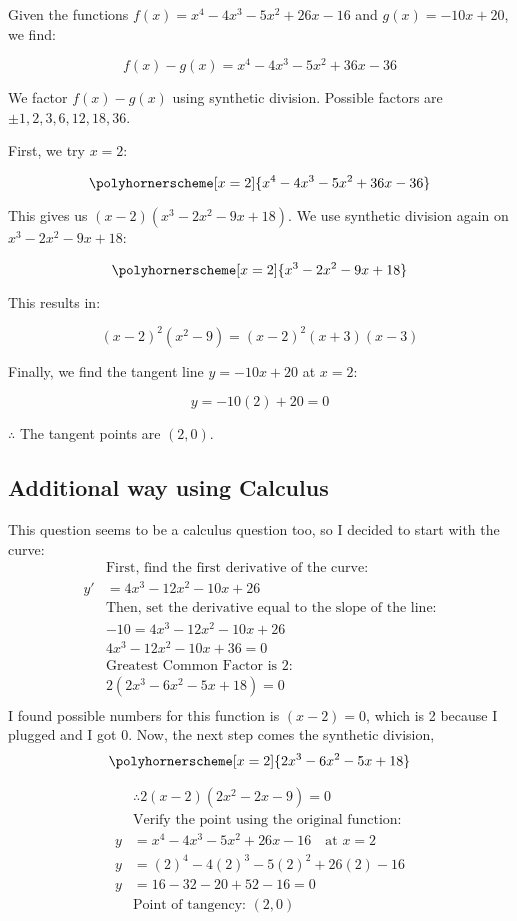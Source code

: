 \documentclass{article}
\newenvironment{solution}{\color{solutioncolor}}{}
\begin{document}
\begin{solution}
Given the functions \( f(x) = x^4 - 4x^3 - 5x^2 + 26x - 16 \) and \( g(x) = -10x + 20 \), we find:

\[
f(x) - g(x) = x^4 - 4x^3 - 5x^2 + 36x - 36
\]

We factor \( f(x) - g(x) \) using synthetic division. Possible factors are \(\pm 1, 2, 3, 6, 12, 18, 36\).

First, we try \( x = 2 \):

\[
\polyhornerscheme[x=2]{x^4-4x^3-5x^2+36x-36}
\]

This gives us \((x - 2)(x^3 - 2x^2 - 9x + 18)\). We use synthetic division again on \( x^3 - 2x^2 - 9x + 18 \):

\[
\polyhornerscheme[x=2]{x^3-2x^2-9x+18}
\]

This results in:

\[
(x - 2)^2(x^2 - 9) = (x - 2)^2(x + 3)(x - 3)
\]

Finally, we find the tangent line \( y = -10x + 20 \) at \( x = 2 \):

\[
y = -10(2) + 20 = 0
\]

$\therefore$ The tangent points are \((2, 0)\).

\subsection*{Additional way using Calculus}
This question seems to be a calculus question too, so I decided to start with the curve:
    \begin{align*}
        &\text{First, find the first derivative of the curve:} \\
        y' &= 4x^3 - 12x^2 - 10x + 26 \\
        &\text{Then, set the derivative equal to the slope of the line:} \\
        &-10=4x^3 - 12x^2 - 10x + 26  \\
        &4x^3 - 12x^2 - 10x + 36 = 0 \\
        &\text{Greatest Common Factor is 2:}\\
        & 2(2x^3-6x^2-5x+18)=0 \\
\end{align*}
      I found possible numbers for this function is $(x-2)= 0$, which is 2 because I plugged and I got 0. Now, the next step comes the synthetic division, 
      $$\polyhornerscheme[x=2]{2x^3-6x^2-5x+18}$$

\begin{align*}
&\therefore 2(x-2)(2x^2-2x-9)=0\\
        &\text{Verify the point using the original function:} \\
        y &= x^4 - 4x^3 - 5x^2 + 26x - 16 \quad \text{at } x = 2 \\
        y &= (2)^4 - 4(2)^3 - 5(2)^2 + 26(2) - 16 \\
        y &= 16-32-20+52-16 = 0 \\
        &\text{Point of tangency: } (2, 0)
    \end{align*}
\end{solution}
\end{document}
